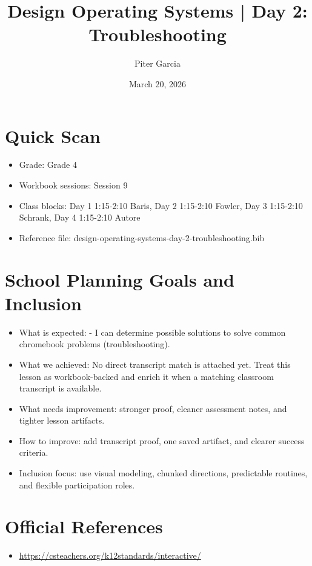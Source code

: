 \documentclass[11pt]{article}
\title{Design Operating Systems | Day 2: Troubleshooting}
\author{Piter Garcia}
\date{March 20, 2026}
\begin{document}
\maketitle
\section*{Quick Scan}
\begin{itemize}[leftmargin=*]
\item Grade: Grade 4
\item Workbook sessions: Session 9
\item Class blocks: Day 1 1:15-2:10 Baris, Day 2 1:15-2:10 Fowler, Day 3 1:15-2:10 Schrank, Day 4 1:15-2:10 Autore
\item Reference file: design-operating-systems-day-2-troubleshooting.bib
\end{itemize}
\section*{School Planning Goals and Inclusion}
\begin{itemize}[leftmargin=*]
\item What is expected: - I can determine possible solutions to solve common chromebook problems (troubleshooting).
\item What we achieved: No direct transcript match is attached yet. Treat this lesson as workbook-backed and enrich it when a matching classroom transcript is available.
\item What needs improvement: stronger proof, cleaner assessment notes, and tighter lesson artifacts.
\item How to improve: add transcript proof, one saved artifact, and clearer success criteria.
\item Inclusion focus: use visual modeling, chunked directions, predictable routines, and flexible participation roles.
\end{itemize}
\section*{Official References}
\begin{itemize}[leftmargin=*]
\item \url{https://csteachers.org/k12standards/interactive/}

\end{itemize}
\end{document}
